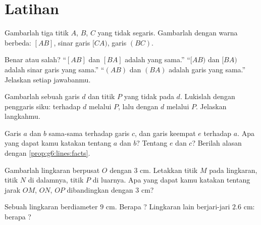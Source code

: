 \section{Latihan}

\begin{exercise}[$\star$]\label{exo:g6:lines:1}
Gambarlah tiga titik $A$, $B$, $C$ yang tidak segaris. Gambarlah
dengan warna berbeda:  $[AB]$, sinar garis $[CA)$, garis $(BC)$.
\end{exercise}

\begin{exercise}[$\star$]\label{exo:g6:lines:2}
Benar atau salah? ``$[AB]$ dan $[BA]$ adalah  yang sama.''
``$[AB)$ dan $[BA)$ adalah sinar garis yang sama.'' ``$(AB)$ dan
$(BA)$ adalah garis yang sama.'' Jelaskan setiap jawabanmu.
\end{exercise}

\begin{exercise}[$\star$]\label{exo:g6:lines:3}
Gambarlah sebuah garis $d$ dan titik $P$ yang tidak pada $d$.
Lukislah dengan penggaris siku:  terhadap $d$ melalui
$P$, lalu  dengan $d$ melalui $P$. Jelaskan langkahmu.
\end{exercise}

\begin{exercise}[$\star$]\label{exo:g6:lines:4}
Garis $a$ dan $b$ sama-sama  terhadap garis $c$, dan garis
keempat $e$  terhadap $a$. Apa yang dapat kamu katakan
tentang $a$ dan $b$? Tentang $e$ dan $c$? Berilah alasan dengan
\cref{prop:g6:lines:facts}.
\end{exercise}

\begin{exercise}[$\star$]\label{exo:g6:lines:5}
Gambarlah lingkaran berpusat $O$ dengan  $3$ cm. Letakkan
titik $M$ pada lingkaran, titik $N$ di dalamnya, titik $P$ di luarnya.
Apa yang dapat kamu katakan tentang jarak $OM$, $ON$, $OP$
dibandingkan dengan $3$ cm?
\end{exercise}

\begin{exercise}[$\star$]\label{exo:g6:lines:6}
Sebuah lingkaran berdiameter $9$ cm. Berapa ? Lingkaran
lain berjari-jari $2.6$ cm: berapa ?
\end{exercise}

